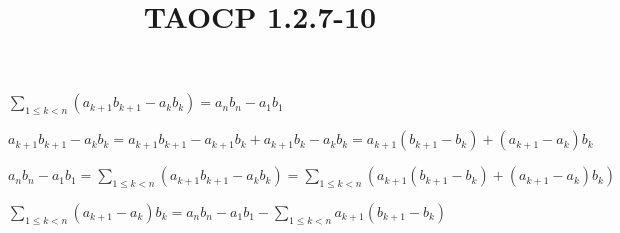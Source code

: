 \documentclass{article}
\title{TAOCP 1.2.7\mbox{-}10}
\begin{document}
\maketitle

\( \sum_{1\leq k < n} (a_{k+1}b_{k+1} - a_{k}b_{k}) = a_{n}b_{n} - a_{1}b_{1} \)

\( a_{k+1}b_{k+1} - a_{k}b_{k} = a_{k+1}b_{k+1} - a_{k+1}b_{k} + a_{k+1}b_{k} - a_{k}b_{k} = a_{k+1}(b_{k+1}-b_{k}) + (a_{k+1}-a_{k})b_{k} \)

\( a_{n}b_{n} - a_{1}b_{1} = \sum_{1\leq k < n} (a_{k+1}b_{k+1} - a_{k}b_{k}) = \sum_{1\leq k < n} (a_{k+1}(b_{k+1}-b_{k}) + (a_{k+1}-a_{k})b_{k}) \)

\( \sum_{1\leq k < n}(a_{k+1}-a_{k})b_{k} = a_{n}b_{n} - a_{1}b_{1} - \sum_{1\leq k < n} a_{k+1}(b_{k+1}-b_{k}) \)
\end{document}
